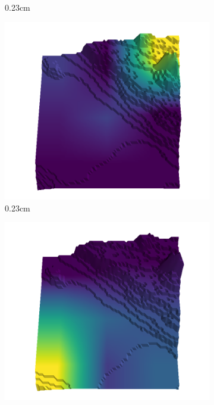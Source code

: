 \documentclass[../document.tex]{subfiles}
\begin{document}
\begin{figure}[H]
\begin{subfigure}[b]{0.242\linewidth}
            \caption{0.23cm}
            \end{subfigure}
            \begin{subfigure}[b]{0.242\linewidth}
            \includegraphics[width=\linewidth]{../img/5/quarry/false_positive/27-patch-3d-majavi-colormap-50.png}
            \caption{0.23cm}
            \end{subfigure}
            \begin{subfigure}[b]{0.242\linewidth}
            \includegraphics[width=\linewidth]{../img/5/quarry/false_positive/28-patch-3d-majavi-colormap-55.png}

\end{subfigure}
\end{figure}
\end{document}
